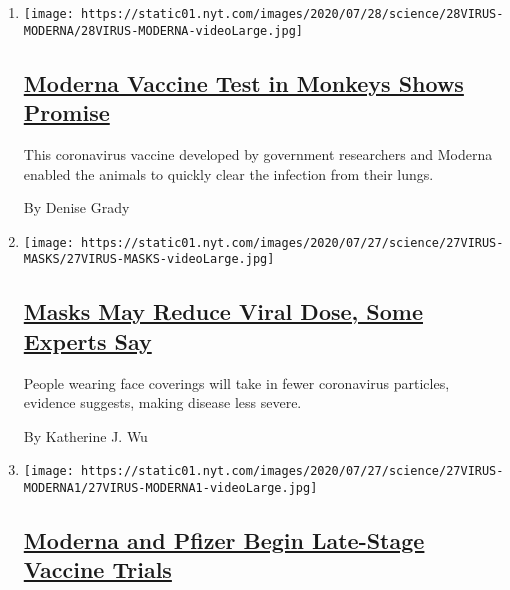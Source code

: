 \begin{enumerate}
\def\labelenumi{\arabic{enumi}.}
\item
  \texttt{[image: https://static01.nyt.com/images/2020/07/28/science/28VIRUS-MODERNA/28VIRUS-MODERNA-videoLarge.jpg]}

  \hypertarget{moderna-vaccine-test-in-monkeys-shows-promise}{%
  \subsection{\texorpdfstring{\href{/2020/07/28/health/coronavirus-moderna-vaccine-monkeys.html}{Moderna
  Vaccine Test in Monkeys Shows
  Promise}}{Moderna Vaccine Test in Monkeys Shows Promise}}\label{moderna-vaccine-test-in-monkeys-shows-promise}}

  This coronavirus vaccine developed by government researchers and
  Moderna enabled the animals to quickly clear the infection from their
  lungs.

  By Denise Grady
\item
  \texttt{[image: https://static01.nyt.com/images/2020/07/27/science/27VIRUS-MASKS/27VIRUS-MASKS-videoLarge.jpg]}

  \hypertarget{masks-may-reduce-viral-dose-some-experts-say}{%
  \subsection{\texorpdfstring{\href{/2020/07/27/health/coronavirus-mask-protection.html}{Masks
  May Reduce Viral Dose, Some Experts
  Say}}{Masks May Reduce Viral Dose, Some Experts Say}}\label{masks-may-reduce-viral-dose-some-experts-say}}

  People wearing face coverings will take in fewer coronavirus
  particles, evidence suggests, making disease less severe.

  By Katherine J. Wu
\item
  \texttt{[image: https://static01.nyt.com/images/2020/07/27/science/27VIRUS-MODERNA1/27VIRUS-MODERNA1-videoLarge.jpg]}

  \hypertarget{moderna-and-pfizer-begin-late-stage-vaccine-trials}{%
  \subsection{\texorpdfstring{\href{/2020/07/27/health/moderna-vaccine-covid.html}{Moderna
  and Pfizer Begin Late-Stage Vaccine
  Trials}}{Moderna and Pfizer Begin Late-Stage Vaccine Trials}}\label{moderna-and-pfizer-begin-late-stage-vaccine-trials}}


\end{enumerate}
